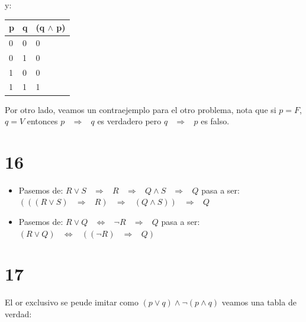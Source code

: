\documentclass[12pt, fleqn]{article}                            %
\DeclareMathOperator \Space     {\quad}                         %
\DeclareMathOperator \MiniSpace {\;}                            %
\theoremstyle{break}                                            %
\newcommand \lEqual  {\MiniSpace \Leftrightarrow \MiniSpace}    %
\newcommand \lInfire {\MiniSpace \Rightarrow \MiniSpace}        %
\begin{document}
    y:\\
    \begin{tabular}{|l|l|l|} 
        \hline
        p & q  & (q $\wedge$ p)   \\ \hline
        0 & 0  &        0         \\ \hline 
        0 & 1  &        0         \\ \hline 
        1 & 0  &        0         \\ \hline 
        1 & 1  &        1         \\ \hline 
    \end{tabular}

  

    Por otro lado, veamos un contraejemplo para el otro problema, 
    nota que si $p = F$, $q = V$ entonces $p \lInfire q$ es verdadero
    pero $q \lInfire p$ es falso.





\section{16}

    \begin{itemize}
        \item 
            Pasemos de: $R \vee S \lInfire R \lInfire Q \wedge S \lInfire Q$
            pasa a ser:\\
            $( ( (R \vee S) \lInfire R) \lInfire (Q \wedge S) ) \lInfire Q$

        \item
            Pasemos de: $R \vee Q \lEqual \neg R \lInfire Q$
            pasa a ser:\\
            $(R \vee Q) \lEqual  ((\neg R) \lInfire Q)$    
    \end{itemize}

            
\section{17}    

El or exclusivo se peude imitar como $(p \vee q) \wedge \neg(p \wedge q)$
veamos una tabla de verdad:             \\
\end{document}
